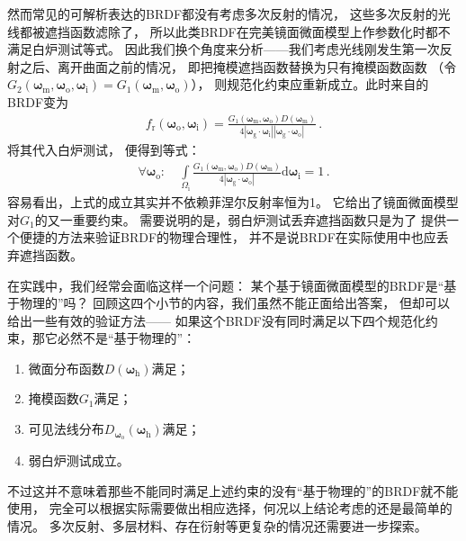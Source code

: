 然而常见的可解析表达的BRDF都没有考虑多次反射的情况，
这些多次反射的光线都被遮挡函数滤除了，
所以此类BRDF在完美镜面微面模型上作参数化时都不满足白炉测试等式。
因此我们换个角度来分析——我们考虑光线刚发生第一次反射之后、离开曲面之前的情况，
即把掩模遮挡函数替换为只有掩模函数函数
（令$G_2({\bm\omega}_{\mathrm{m}},{\bm\omega}_{\mathrm{o}},{\bm\omega}_{\mathrm{i}})
    =G_1({\bm\omega}_{\mathrm{m}},{\bm\omega}_{\mathrm{o}})$），
则规范化约束应重新成立。此时来自的BRDF变为
\begin{align}
    f_{\mathrm{r}}({\bm\omega}_{\mathrm{o}},{\bm\omega}_{\mathrm{i}})
    =\frac{G_1({\bm\omega}_{\mathrm{m}},{\bm\omega}_{\mathrm{o}})D({\bm\omega}_{\mathrm{m}})}
    {4|{\bm\omega}_{\mathrm{g}}\cdot{\bm\omega}_{\mathrm{i}}||{\bm\omega}_{\mathrm{g}}\cdot{\bm\omega}_{\mathrm{o}}|}\, .
\end{align}
将其代入白炉测试，
便得到等式：
\begin{align}\label{eq:08ex01-WeakWhiteFurnaceTest}
    \forall {\bm\omega}_{\mathrm{o}}: \quad\int\limits_{{\varOmega}_{\mathrm{i}}}
    \frac{G_1({\bm\omega}_{\mathrm{m}},{\bm\omega}_{\mathrm{o}})D({\bm\omega}_{\mathrm{m}})}
    {4|{\bm\omega}_{\mathrm{g}}\cdot{\bm\omega}_{\mathrm{o}}|}\mathrm{d}{\bm\omega}_{\mathrm{i}}=1\, .
\end{align}
容易看出，上式的成立其实并不依赖菲涅尔反射率恒为1。
它给出了镜面微面模型对$G_1$的又一重要约束。
需要说明的是，弱白炉测试丢弃遮挡函数只是为了
提供一个便捷的方法来验证BRDF的物理合理性，
并不是说BRDF在实际使用中也应丢弃遮挡函数。

在实践中，我们经常会面临这样一个问题：
某个基于镜面微面模型的BRDF是“基于物理的”吗？
回顾这四个小节的内容，我们虽然不能正面给出答案，
但却可以给出一些有效的验证方法——
如果这个BRDF没有同时满足以下四个规范化约束，那它必然不是“基于物理的”：
\begin{enumerate}
    \item 微面分布函数$D({\bm\omega}_{\mathrm{h}})$满足；
    \item 掩模函数$G_1$满足；
    \item 可见法线分布$D_{{\bm\omega}_{\mathrm{o}}}({\bm\omega}_{\mathrm{h}})$满足；
    \item 弱白炉测试成立。
\end{enumerate}
不过这并不意味着那些不能同时满足上述约束的没有“基于物理的”的BRDF就不能使用，
完全可以根据实际需要做出相应选择，何况以上结论考虑的还是最简单的情况。
多次反射、多层材料、存在衍射等更复杂的情况还需要进一步探索。

